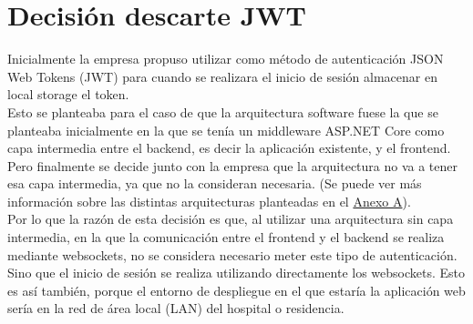 \chapter{Decisión descarte JWT}
\label{anexo-c}




Inicialmente la empresa propuso utilizar como método de autenticación JSON Web Tokens (JWT) \cite{jwt} para cuando se realizara el inicio de sesión almacenar en local storage el token.\\

Esto se planteaba para el caso de que la arquitectura software fuese la que se planteaba inicialmente en la que se tenía un middleware ASP.NET Core como capa intermedia entre el backend, es decir la aplicación existente, y el frontend. Pero finalmente se decide junto con la empresa que la arquitectura no va a tener esa capa intermedia, ya que no la consideran necesaria. (Se puede ver más información sobre las distintas arquitecturas planteadas en el \hyperref[anexo-a]{Anexo A}). \\

Por lo que la razón de esta decisión es que, al utilizar una arquitectura sin capa intermedia, en la que la comunicación entre el frontend y el backend se realiza mediante websockets, no se considera necesario meter este tipo de autenticación. Sino que el inicio de sesión se realiza utilizando directamente los websockets. Esto es así también, porque el entorno de despliegue en el que estaría la aplicación web sería en la red de área local (LAN) del hospital o residencia.
